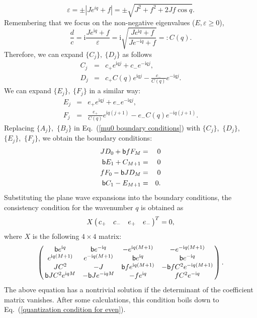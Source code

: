 \documentclass[aps, prb, showpacs, twocolumn, %
amssymb,superscriptaddress]{revtex4}
\newcommand{\ii}{\text{i}}
\begin{document}
\begin{equation}
\varepsilon = \pm \left| Je^{iq} + f \right| = \pm \sqrt{J^{2} + f^{2} + 2Jf \cos q}.
\end{equation}
Remembering that we focus on the non-negative eigenvalues ($E, \varepsilon \geq 0$),
\begin{equation}
\frac{d}{c} = \ii \frac{Je^{\ii q} + f}{\varepsilon} = \ii \sqrt{\frac{Je^{\ii q} + f}{Je^{-\ii q} + f}} =: C \left( q \right).
\end{equation}
Therefore, we can expand $\{ C_{j} \},~\{ D_{j} \}$ as follows
\begin{eqnarray}
C_{j} &=& c_{+} e^{\ii qj} + c_{-} e^{-\ii qj}, \nonumber \\
D_{j} &=& c_{+} C \left( q \right) e^{\ii qj} - \frac{c_{-}}{C \left( q \right)} e^{-\ii qj}.
\end{eqnarray}
We can expand $\{ E_{j} \},~\{ F_{j} \}$ in a similar way:
\begin{eqnarray}
E_{j} &=& e_{+} e^{\ii qj} + e_{-} e^{- \ii qj}, \nonumber \\
F_{j} &=& \frac{e_{+}}{C \left( q \right)} e^{\ii q (j+1)} - e_{-} C \left( q \right) e^{- \ii q (j+1)}.
\end{eqnarray}
Replacing $\{ A_{j} \}$,~$\{ B_{j} \}$ in Eq.~(\ref{mu0 boundary conditions}) with $\{ C_{j} \}$,~$\{ D_{j} \}$,~$\{ E_{j} \}$,~$\{ F_{j} \}$, we obtain the boundary conditions:
\begin{eqnarray}
JD_{0} + {\sf b} fF_{M} &=& 0 \nonumber \\
{\sf b} E_{1} + C_{M+1} &=& 0 \nonumber \\
fF_{0} - {\sf b} JD_{M} &=& 0 \nonumber \\
{\sf b} C_{1} - E_{M+1} &=& 0.
\end{eqnarray}
Substituting the plane wave expansions into the boundary conditions, the consistency condition for the wavenumber $q$ is obtained as
\begin{equation}
X \left( \begin{array}{@{\,}cccc@{\,}}  c_{+} & c_{-} & e_{+} & e_{-} \\ \end{array} \right)^{T} = 0,
\end{equation}
where $X$ is the following $4 \times 4$ matrix:
\begin{equation}
\left( \begin{array}{@{\,}cccc@{\,}}
		{\sf b} e^{\ii q} & {\sf b} e^{-\ii q} & - e^{\ii q (M+1)} & - e^{-\ii q (M+1)} \\
		e^{\ii q (M+1)} & e^{-\ii q (M+1)} & {\sf b} e^{\ii q} & {\sf b} e^{-\ii q} \\
		J C^{2} & -J & {\sf b} f e^{\ii q (M+1)} & -{\sf b} f C^{2} e^{-\ii q (M+1)} \\
		{\sf b} J C^{2} e^{\ii qM} & -{\sf b} J e^{-\ii qM} & -f e^{\ii q} & f C^{2} e^{-\ii q} \\
	\end{array} \right).
\end{equation}
The above equation has a nontrivial solution if the determinant of the coefficient matrix vanishes. After some calculations, this condition boils down to Eq.~(\ref{quantization condition for even}).
\end{document}

